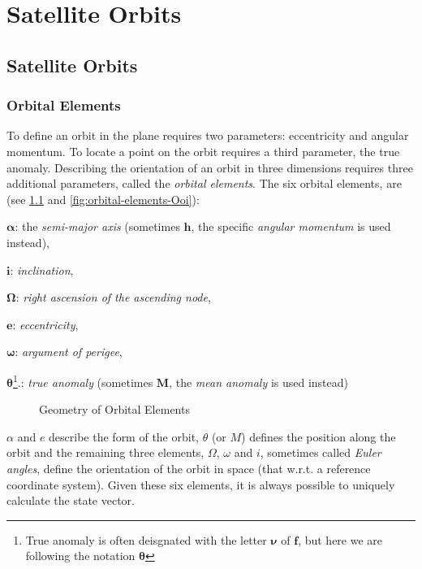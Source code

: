 \chapter{Satellite Orbits}
\label{ch:satellite-orbits}

\section{Satellite Orbits}

\subsection{Orbital Elements}
\label{ssec:orbital-elements}
To define an orbit in the plane requires two parameters: eccentricity and angular
momentum. To locate a point on the orbit requires a third parameter, the true 
anomaly. Describing the orientation of an orbit in three dimensions requires 
three additional parameters, called the \emph{orbital elements}. The six 
orbital elements, are (see \ref{fig:orbital-elements-3d} and 
\ref{fig:orbital-elements-Ooi}):
\begin{description}
    \item $\bm{\alpha}$: the \emph{semi-major axis} (sometimes $\bm{h}$, the specific 
    \emph{angular momentum} is used instead),
    \item $\bm{i}$: \emph{inclination},
    \item $\bm{\Omega}$: \emph{right ascension of the ascending node},
    \item $\bm{e}$: \emph{eccentricity},
    \item $\bm{\omega}$: \emph{argument of perigee},
    \item $\bm{\theta}$\footnote{True anomaly is often deisgnated with the letter 
    $\bm{\nu}$ of $\bm{f}$, but here we are following the notation $\bm{\theta}$}.: 
    \emph{true anomaly} (sometimes $\bm{M}$, the \emph{mean anomaly} 
    is used instead)
\end{description}

\begin{figure}
\centering

\caption{Geometry of Orbital Elements}
\label{fig:orbital-elements-3d}
\end{figure}

$\alpha$ and $e$ describe the form of the orbit, $\theta$ (or $M$) defines the 
position along the orbit and the remaining three elements, $\Omega$, $\omega$ 
and $i$, sometimes called \emph{Euler angles}, define the orientation of the 
orbit in space (that w.r.t. a reference coordinate system). Given these six 
elements, it is always possible to uniquely calculate the state vector.

